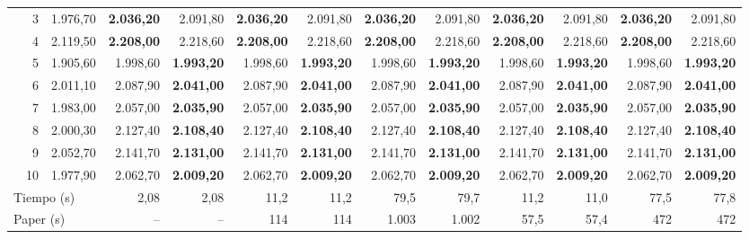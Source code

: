 \documentclass[11pt,a4paper]{article}
\begin{document}
\begin{table}[!htbp]
{\begin{tabular}{rrr rr rr rr rr rr}
 & 3 & 1.976{,}70 & \textbf{2.036{,}20} & 2.091{,}80 & \textbf{2.036{,}20} & 2.091{,}80 & \textbf{2.036{,}20} & 2.091{,}80 & \textbf{2.036{,}20} & 2.091{,}80 & \textbf{2.036{,}20} & 2.091{,}80 \\
 & 4 & 2.119{,}50 & \textbf{2.208{,}00} & 2.218{,}60 & \textbf{2.208{,}00} & 2.218{,}60 & \textbf{2.208{,}00} & 2.218{,}60 & \textbf{2.208{,}00} & 2.218{,}60 & \textbf{2.208{,}00} & 2.218{,}60 \\
 & 5 & 1.905{,}60 & 1.998{,}60 & \textbf{1.993{,}20} & 1.998{,}60 & \textbf{1.993{,}20} & 1.998{,}60 & \textbf{1.993{,}20} & 1.998{,}60 & \textbf{1.993{,}20} & 1.998{,}60 & \textbf{1.993{,}20} \\
 & 6 & 2.011{,}10 & 2.087{,}90 & \textbf{2.041{,}00} & 2.087{,}90 & \textbf{2.041{,}00} & 2.087{,}90 & \textbf{2.041{,}00} & 2.087{,}90 & \textbf{2.041{,}00} & 2.087{,}90 & \textbf{2.041{,}00} \\
 & 7 & 1.983{,}00 & 2.057{,}00 & \textbf{2.035{,}90} & 2.057{,}00 & \textbf{2.035{,}90} & 2.057{,}00 & \textbf{2.035{,}90} & 2.057{,}00 & \textbf{2.035{,}90} & 2.057{,}00 & \textbf{2.035{,}90} \\
 & 8 & 2.000{,}30 & 2.127{,}40 & \textbf{2.108{,}40} & 2.127{,}40 & \textbf{2.108{,}40} & 2.127{,}40 & \textbf{2.108{,}40} & 2.127{,}40 & \textbf{2.108{,}40} & 2.127{,}40 & \textbf{2.108{,}40} \\
 & 9 & 2.052{,}70 & 2.141{,}70 & \textbf{2.131{,}00} & 2.141{,}70 & \textbf{2.131{,}00} & 2.141{,}70 & \textbf{2.131{,}00} & 2.141{,}70 & \textbf{2.131{,}00} & 2.141{,}70 & \textbf{2.131{,}00} \\
 & 10 & 1.977{,}90 & 2.062{,}70 & \textbf{2.009{,}20} & 2.062{,}70 & \textbf{2.009{,}20} & 2.062{,}70 & \textbf{2.009{,}20} & 2.062{,}70 & \textbf{2.009{,}20} & 2.062{,}70 & \textbf{2.009{,}20} \\
\midrule
\multicolumn{3}{l}{Tiempo (s)} & 2{,}08 & 2{,}08 & 11{,}2 & 11{,}2 & 79{,}5 & 79{,}7 & 11{,}2 & 11{,}0 & 77{,}5 & 77{,}8 \\
\multicolumn{3}{l}{Paper (s)} & -- & -- & 114 & 114 & 1.003 & 1.002 & 57{,}5 & 57{,}4 & 472 & 472 \\
\bottomrule
\end{tabular}%
}
\end{table}
\end{document}
